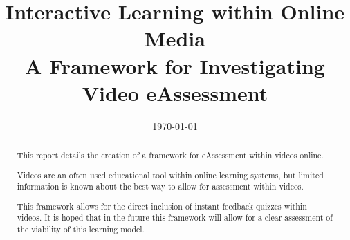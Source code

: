 \documentclass{ecsgdp}         %
\begin{document}
\frontmatter
\title      {Interactive Learning within Online Media\\A Framework for Investigating Video eAssessment}
\addresses  {\groupname\\\deptname\\\univname}
\date       {\today}
\subject    {}
\keywords   {}
\maketitle
\begin{abstract}
This report details the creation of a framework for eAssessment within videos online. 

Videos are an often used educational tool within online learning systems, but limited information is known about the best way to allow for assessment within videos. 

This framework allows for the direct inclusion of instant feedback quizzes within videos. It is hoped that in the future this framework will allow for a clear assessment of the viability of this learning model. 
\end{abstract}
\tableofcontents

\listoffigures
\listoftables
\lstlistoflistings

\listoftodos
\newpage
\end{document}
